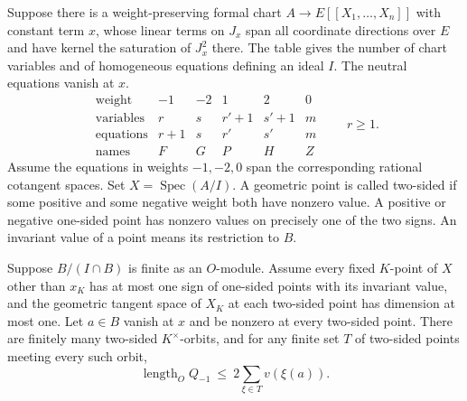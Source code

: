Suppose there is a weight-preserving formal chart
\(A\to E[[X_1,\ldots,X_n]]\) with constant term \(x\), whose linear
terms on \(J_x\) span all coordinate directions over \(E\) and have
kernel the saturation of \(J_x^2\) there. The table gives the number
of chart variables and of homogeneous equations defining an ideal \(I\).
The neutral equations vanish at \(x\).
\[
\begin{array}{c|rrrrr}
 \text{weight}&-1&-2&1&2&0\\ \hline
 \text{variables}&r&s&r'+1&s'+1&m\\
 \text{equations}&r+1&s&r'&s'&m\\
 \text{names}&F&G&P&H&Z
\end{array}
\qquad r\ge1 .
\]
Assume the equations in weights \(-1,-2,0\) span the corresponding
rational cotangent spaces. Set \(X=\operatorname{Spec}(A/I)\).
A geometric point is called two-sided if some positive and some
negative weight both have nonzero value. A positive or negative
one-sided point has nonzero values on precisely one of the two signs.
An invariant value of a point means its restriction to \(B\).

\begin{theorem}
\label{newcoh:orbitdegree}
Suppose \(B/(I\cap B)\) is finite as an \(O\)-module. Assume every
fixed \(K\)-point of \(X\) other than \(x_K\) has at most one sign of
one-sided points with its invariant value, and the geometric tangent
space of \(X_K\) at each two-sided point has dimension at most one.
Let \(a\in B\) vanish at \(x\) and be nonzero at every two-sided point.
There are finitely many two-sided \(K^\times\)-orbits, and for any finite
set \(T\) of two-sided points meeting every such orbit,
\[
 \operatorname{length}_O Q_{-1}\ \le\ 2\sum_{\xi\in T}v(\xi(a)).
\]
\end{theorem}

